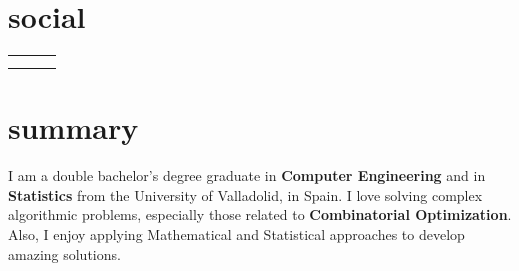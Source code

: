 \documentclass{friggeri-cv}
\newcommand{\myhref}[2]{\href[pdfnewwindow=true]{#1}{#2}}
\begin{document}


  \section{social}

    \vspace{-1.5em}
    \begin{center}
      \renewcommand{\arraystretch}{1.5}
      \begin{tabular}{ p{18em} p{19em} p{18em} }
        \myhref{https://garciparedes.me}{\faHome\quad Website: garciparedes.me}
        &
        \myhref{mailto:sergio@garciparedes.me}{\faEnvelope\quad Email: sergio@garciparedes.me}
        &
        \myhref{https://es.linkedin.com/in/garciparedes/en}{\faLinkedin\quad LinkedIn: Sergio García Prado}
        \\

        \myhref{https://github.com/garciparedes}{\faGithub\quad GitHub: @garciparedes}
        &
        \myhref{https://scholar.google.es/citations?user=X3Mb7BAAAAAJ}{\faGraduationCap\quad Scholar: Sergio García Prado}
        &
        \myhref{https://stackoverflow.com/users/3921457/garciparedes}{\faStackOverflow\quad StackOverflow: @garciparedes}
        \\
      \end{tabular}
    \end{center}




  \section{summary}

  I am a double bachelor's degree graduate in \textbf{Computer Engineering} and in \textbf{Statistics} from the University of Valladolid, in Spain. I love solving complex algorithmic problems, especially those related to \textbf{Combinatorial Optimization}. Also, I enjoy applying Mathematical and Statistical approaches to develop amazing solutions. 
\end{document}
